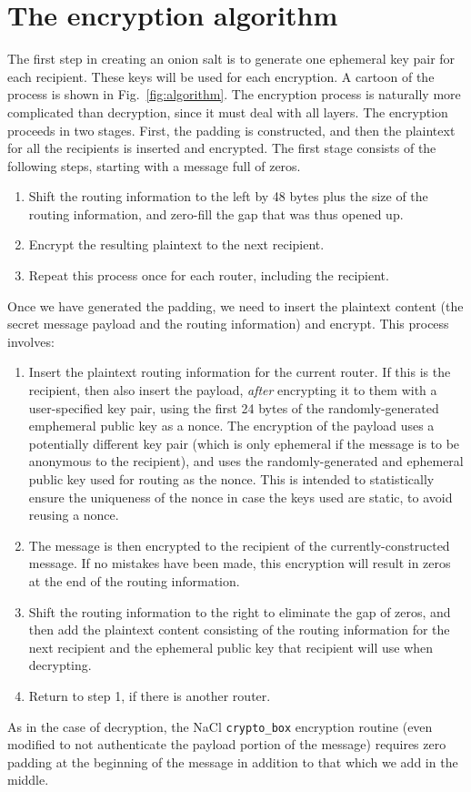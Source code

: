 \documentclass[letterpaper,twocolumn,amsmath,amssymb,pre,aps,10pt]{revtex4-1}
\begin{document}
\section{The encryption algorithm}

The first step in creating an onion salt is to generate one ephemeral
key pair for each recipient.  These keys will be used for each
encryption.  A cartoon of the process is shown in
Fig.~\ref{fig:algorithm}.  The encryption process is naturally more
complicated than decryption, since it must deal with all layers.  The
encryption proceeds in two stages.  First, the padding is constructed,
and then the plaintext for all the recipients is inserted and
encrypted.  The first stage consists of the following steps, starting
with a message full of zeros.
\begin{enumerate}
\item Shift the routing information to the left by 48 bytes plus the
  size of the routing information, and zero-fill the gap that was thus
  opened up.
\item Encrypt the resulting plaintext to the next recipient.
\item Repeat this process once for each router, including the
  recipient.
\end{enumerate}
Once we have generated the padding, we need to insert the plaintext
content (the secret message payload and the routing information) and
encrypt.  This process involves:
\begin{enumerate}
\item Insert the plaintext routing information for the current router.
  If this is the recipient, then also insert the payload, \emph{after}
  encrypting it to them with a user-specified key pair, using the
  first 24 bytes of the randomly-generated emphemeral public key as a
  nonce.  The encryption of the payload uses a potentially different
  key pair (which is only ephemeral if the message is to be anonymous
  to the recipient), and uses the randomly-generated and ephemeral
  public key used for routing as the nonce.  This is intended to
  statistically ensure the uniqueness of the nonce in case the keys
  used are static, to avoid reusing a nonce.
\item The message is then encrypted to the recipient of the
  currently-constructed message.  If no mistakes have been made, this
  encryption will result in zeros at the end of the routing
  information.
\item Shift the routing information to the right to eliminate the gap
  of zeros, and then add the plaintext content consisting of the
  routing information for the next recipient and the ephemeral public
  key that recipient will use when decrypting.
\item Return to step 1, if there is another router.
\end{enumerate}
As in the case of decryption, the NaCl \texttt{crypto\_box} encryption
routine (even modified to not authenticate the payload portion of the
message) requires zero padding at the beginning of the message in
addition to that which we add in the middle.
\end{document}
